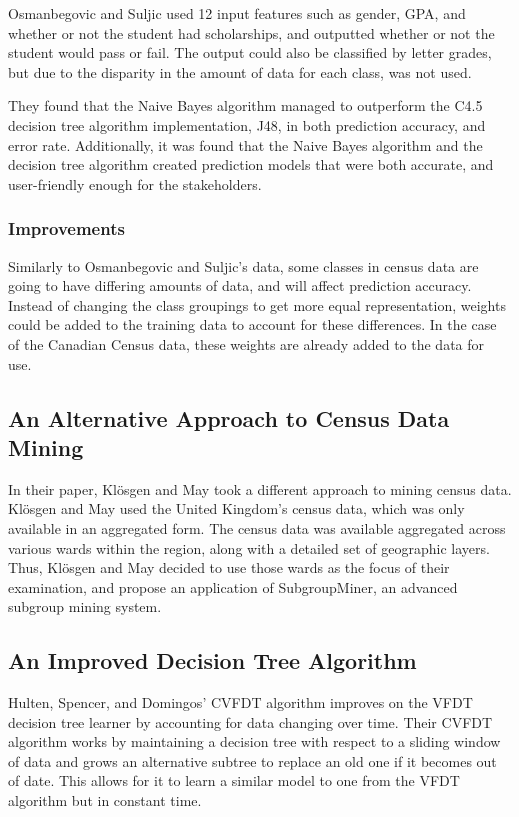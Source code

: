 \documentclass[10pt, conference, compsocconf]{IEEEtran}
\begin{document}
Osmanbegovic and Suljic used 12 input features such as gender, GPA, and whether or not the student had scholarships, and outputted whether or not the student would pass or fail. The output could also be classified by letter grades, but due to the disparity in the amount of data for each class, was not used. \cite{performance1}

They found that the Naive Bayes algorithm managed to outperform the C4.5 decision tree algorithm implementation, J48, in both prediction accuracy, and error rate. Additionally, it was found that the Naive Bayes algorithm and the decision tree algorithm created prediction models that were both accurate, and user-friendly enough for the stakeholders. \cite{performance1}

\subsubsection{Improvements}
Similarly to Osmanbegovic and Suljic's data, some classes in census data are going to have differing amounts of data, and will affect prediction accuracy. Instead of changing the class groupings to get more equal representation, weights could be added to the training data to account for these differences. In the case of the Canadian Census data, these weights are already added to the data for use.

\subsection{An Alternative Approach to Census Data Mining}
In their paper, Klösgen and May took a different approach to mining census data. Klösgen and May used the United Kingdom's census data, which was only available in an aggregated form. The census data was available aggregated across various wards within the region, along with a detailed set of geographic layers. Thus, Klösgen and May decided to use those wards as the focus of their examination, and propose an application of SubgroupMiner, an advanced subgroup mining system. \cite{census1}

\subsection{An Improved Decision Tree Algorithm}
Hulten, Spencer, and Domingos' CVFDT algorithm improves on the VFDT decision tree learner by accounting for data changing over time. \cite{dtrees1} Their CVFDT algorithm works by maintaining a decision tree with respect to a sliding window of data and grows an alternative subtree to replace an old one if it becomes out of date. This allows for it to learn a similar model to one from the VFDT algorithm but in constant time. \cite{dtrees1}
\end{document}
